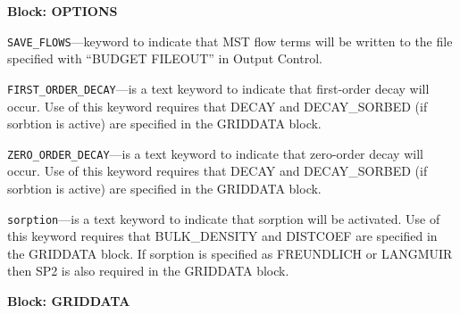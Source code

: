 
\item \textbf{Block: OPTIONS}

\begin{description}
\item \texttt{SAVE\_FLOWS}---keyword to indicate that MST flow terms will be written to the file specified with ``BUDGET FILEOUT'' in Output Control.

\item \texttt{FIRST\_ORDER\_DECAY}---is a text keyword to indicate that first-order decay will occur.  Use of this keyword requires that DECAY and DECAY\_SORBED (if sorbtion is active) are specified in the GRIDDATA block.

\item \texttt{ZERO\_ORDER\_DECAY}---is a text keyword to indicate that zero-order decay will occur.  Use of this keyword requires that DECAY and DECAY\_SORBED (if sorbtion is active) are specified in the GRIDDATA block.

\item \texttt{sorption}---is a text keyword to indicate that sorption will be activated.  Use of this keyword requires that BULK\_DENSITY and DISTCOEF are specified in the GRIDDATA block.  If sorption is specified as FREUNDLICH or LANGMUIR then SP2 is also required in the GRIDDATA block.

\end{description}
\item \textbf{Block: GRIDDATA}

